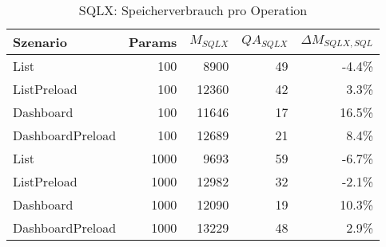 
\begin{table}[ht]
\centering
\caption{SQLX: Speicherverbrauch pro Operation}
\begin{tabular}{lrrrr}
\toprule
Szenario & Params & ${M_{SQLX}}$ & ${QA_{SQLX}}$ & ${\Delta M_{SQLX,SQL}}$ \\
\midrule

	List & 100 & 8900 & 49 & -4.4\% \\
	ListPreload & 100 & 12360 & 42 & 3.3\% \\
	Dashboard & 100 & 11646 & 17 & 16.5\% \\
	DashboardPreload & 100 & 12689 & 21 & 8.4\% \\
	List & 1000 & 9693 & 59 & -6.7\% \\
	ListPreload & 1000 & 12982 & 32 & -2.1\% \\
	Dashboard & 1000 & 12090 & 19 & 10.3\% \\
	DashboardPreload & 1000 & 13229 & 48 & 2.9\% \\
\bottomrule
\end{tabular}
\label{tab:benchmark_sqlx_bytesperop}
\end{table}
	